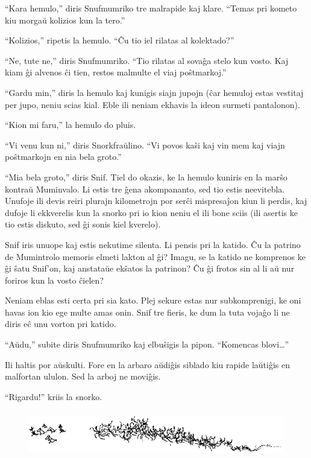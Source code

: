 ``Kara hemulo,'' diris Snufmumriko tre malrapide kaj klare. ``Temas pri kometo kiu morgaŭ kolizios kun la tero.''

``Kolizios,'' ripetis la hemulo. ``Ĉu tio iel rilatas al kolektado?''

``Ne, tute ne,'' diris Snufmumriko. ``Tio rilatas al sovaĝa stelo kun vosto. Kaj kiam ĝi alvenos ĉi tien, restos malmulte el viaj poŝtmarkoj.''

``Gardu min,'' diris la hemulo kaj kunigis siajn jupojn (ĉar hemuloj estas vestitaj per jupo, neniu scias kial. Eble ili neniam ekhavis la ideon surmeti pantalonon).

``Kion mi faru,'' la hemulo do pluis.

``Vi venu kun ni,'' diris Snorkfraŭlino. ``Vi povos kaŝi kaj vin mem kaj viajn poŝtmarkojn en nia bela groto.''

``Mia bela groto,'' diris Snif.
\sectionbreak
Tiel do okazis, ke la hemulo kuniris en la marŝo kontraŭ Muminvalo. Li estis tre ĝena akompananto, sed tio estis neevitebla. Unufoje ili devis reiri plurajn kilometrojn por serĉi mispresaĵon kiun li perdis, kaj dufoje li ekkverelis kun la snorko pri io kion neniu el ili bone sciis (ili asertis ke tio estis diskuto, sed ĝi sonis kiel kverelo).

Snif iris unuope kaj estis nekutime silenta. Li pensis pri la katido. Ĉu la patrino de Mumintrolo memoris elmeti lakton al ĝi? Imagu, se la katido ne komprenos ke ĝi ŝatu Snif'on, kaj anstataŭe ekŝatos la patrinon? Ĉu ĝi frotos sin al li aŭ nur foriros kun la vosto ĉielen?

Neniam eblas esti certa pri sia kato. Plej sekure estas nur subkomprenigi, ke oni havas ion kio ege multe amas onin. Snif tre fieris, ke dum la tuta vojaĝo li ne diris eĉ unu vorton pri katido.

``Aŭdu,'' subite diris Snufmumriko kaj elbuŝigis la pipon. ``Komencas blovi{\ldots}''

Ili haltis por aŭskulti. Fore en la arbaro aŭdiĝis siblado kiu rapide laŭtiĝis en malfortan ululon. Sed la arboj ne moviĝis.

``Rigardu!'' kriis la snorko.

\begin{figure}[htbp]
\centering
\includegraphics[width=400pt,height=58pt]{8-4.png}
\caption{}
\label{8-4}
\end{figure}

